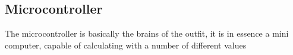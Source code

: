 % 

\subsection{Microcontroller}

The microcontroller is basically the brains of the outfit, it is in essence a mini computer, capable of calculating with a number of different values

%
